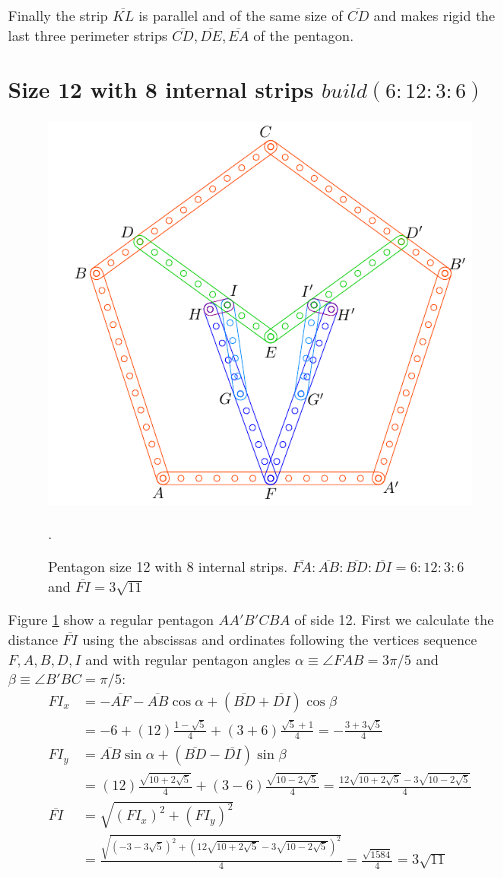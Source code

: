 \documentclass[11pt]{article}
\begin{document}
Finally the strip $\overline{KL}$ is parallel and of the same size of $\overline{CD}$ and makes rigid the last three perimeter strips $\overline{CD},\overline{DE},\overline{EA}$ of the pentagon.

\subsection{Size 12 with 8 internal strips $build(6:12:3:6)$}

\begin{figure}[h]
 \centering
 \includegraphics[scale=1.1]{12/penta12-8a}
 \caption{Pentagon size 12 with 8 internal strips. $\overline{FA}:\overline{AB}:\overline{BD}:\overline{DI} = 6:12:3:6$ and $\overline{FI} = 3\sqrt{11}$}.
 \label{fig:penta12-8a}
\end{figure}

Figure \ref{fig:penta12-8a} show a regular pentagon $AA'B'CBA$ of side 12.
First we calculate the distance $\overline{FI}$ using the abscissas and ordinates following the vertices sequence $F,A,B,D,I$ and with regular pentagon angles $\alpha \equiv \angle{FAB}= 3\pi/5$ and $\beta \equiv \angle{B'BC} = \pi/5$:
\begin{align}
FI_x &= -\overline{AF} - \overline{AB}\cos\alpha + (\overline{BD} + \overline{DI})\cos\beta\nonumber\\
 &= -6 + (12)\frac{1-\sqrt5}4 + (3+6)\frac{\sqrt5+1}4 = -\frac{3+3\sqrt5}4\\
FI_y &= \overline{AB}\sin\alpha + (\overline{BD}-\overline{DI})\sin\beta\nonumber\\
 &= (12)\frac{\sqrt{10+2\sqrt5}}4 + (3-6)\frac{\sqrt{10-2\sqrt5}}4
 = \frac{12\sqrt{10+2\sqrt5} - 3\sqrt{10-2\sqrt5}}4\\
\overline{FI} &= \sqrt{(FI_x)^2 + (FI_y)^2}\nonumber\\
 &= \frac{\sqrt{(-3-3\sqrt5)^2 + (12\sqrt{10+2\sqrt5} - 3\sqrt{10-2\sqrt5})^2}}4
 = \frac{\sqrt{1584}}4 = 3\sqrt{11}
\end{align}
\end{document}
